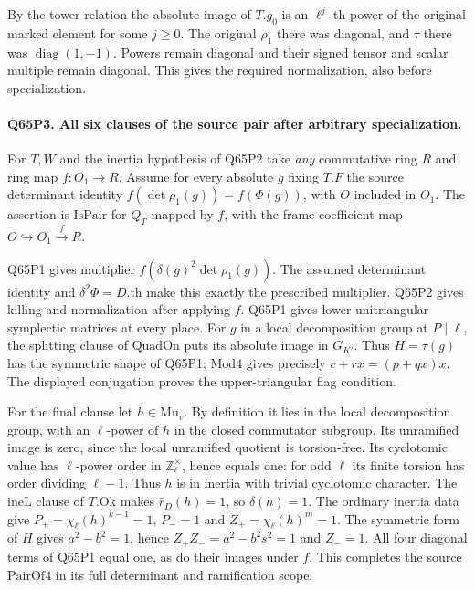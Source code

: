 By the tower relation the absolute image of $T.g_0$ is an
$\ell^j$-th power of the original marked element for some $j\ge0$.
The original $\rho_1$ there was diagonal, and $\tau$ there was
$\operatorname{diag}(1,-1)$. Powers remain diagonal and their
signed tensor and scalar multiple remain diagonal. This gives the
required normalization, also before specialization.

\paragraph{Q65P3. All six clauses of the source pair after arbitrary specialization.}
For $T,W$ and the inertia hypothesis of Q65P2 take \emph{any}
commutative ring $R$ and ring map $f:O_1\to R$. Assume for every
absolute $g$ fixing $T.F$ the source determinant identity
$f(\det\rho_1(g))=f(\Phi(g))$, with $O$ included in $O_1$.
The assertion is $\mathrm{IsPair}$ for $Q_T$ mapped by $f$, with
the frame coefficient map $O\hookrightarrow O_1\xrightarrow{f}R$.

Q65P1 gives multiplier
$f(\delta(g)^2\det\rho_1(g))$. The assumed determinant identity
and $\delta^2\Phi=D.\mathrm{th}$ make this exactly the prescribed
multiplier. Q65P2 gives killing and normalization after applying
$f$. Q65P1 gives lower unitriangular symplectic matrices at every
place. For $g$ in a local decomposition group at $P\mid\ell$, the
splitting clause of $\mathrm{QuadOn}$ puts its absolute image in
$G_{K'}$. Thus $H=\tau(g)$ has the symmetric shape of Q65P1;
$\mathrm{Mod4}$ gives precisely $c+rx=(p+qx)x$. The displayed
conjugation proves the upper-triangular flag condition.

For the final clause let $h\in\mathrm{Mu}_v$. By definition it
lies in the local decomposition group, with an $\ell$-power of
$h$ in the closed commutator subgroup. Its unramified image is zero,
since the local unramified quotient is torsion-free. Its cyclotomic
value has $\ell$-power order in $\mathbb Z_\ell^\times$, hence equals
one: for odd $\ell$ its finite torsion has order dividing $\ell-1$.
Thus $h$ is in inertia with trivial cyclotomic character. The
$\mathrm{ineL}$ clause of $T.\mathrm{Ok}$ makes $\bar r_D(h)=1$,
so $\delta(h)=1$. The ordinary inertia data give
$P_+=\chi_\ell(h)^{k-1}=1$, $P_-=1$ and
$Z_+=\chi_\ell(h)^m=1$. The symmetric form of $H$ gives
$a^2-b^2=1$, hence $Z_+Z_-=a^2-b^2s^2=1$ and $Z_-=1$.
All four diagonal terms of Q65P1 equal one, as do their images
under $f$. This completes the source $\mathrm{PairOf4}$ in its
full determinant and ramification scope.

